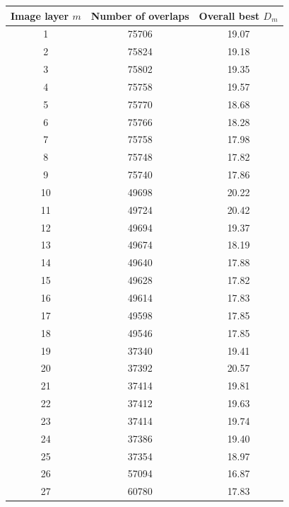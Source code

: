 \documentclass[letterpaper,11pt]{article}
\begin{document}
\begin{table}[!htb]
\centering
\begin{tabular}{c c c}
Image layer $m$ & Number of overlaps & Overall best $D_{m}$ \\
\hline
1               & 75706              & 19.07 \\
2               & 75824              & 19.18 \\
3               & 75802              & 19.35 \\
4               & 75758              & 19.57 \\
5               & 75770              & 18.68 \\
6               & 75766              & 18.28 \\
7               & 75758              & 17.98 \\
8               & 75748              & 17.82 \\
9               & 75740              & 17.86 \\
10              & 49698              & 20.22 \\
11              & 49724              & 20.42 \\
12              & 49694              & 19.37 \\
13              & 49674              & 18.19 \\
14              & 49640              & 17.88 \\
15              & 49628              & 17.82 \\
16              & 49614              & 17.83 \\
17              & 49598              & 17.85 \\
18              & 49546              & 17.85 \\
19              & 37340              & 19.41 \\
20              & 37392              & 20.57 \\
21              & 37414              & 19.81 \\
22              & 37412              & 19.63 \\
23              & 37414              & 19.74 \\
24              & 37386              & 19.40 \\
25              & 37354              & 18.97 \\
26              & 57094              & 16.87 \\
27              & 60780              & 17.83 \\

\end{tabular}
\end{table}
\end{document}
